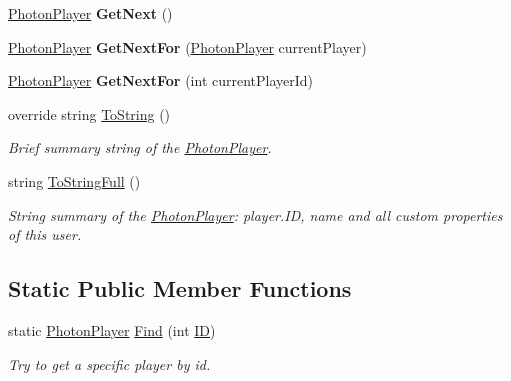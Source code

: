 \begin{DoxyCompactItemize}
\item 
\hyperlink{class_photon_player}{Photon\+Player} {\bfseries Get\+Next} ()\hypertarget{class_photon_player_a4c7bf5d0bf28c15b67929a8a5297b96e}{}\label{class_photon_player_a4c7bf5d0bf28c15b67929a8a5297b96e}

\item 
\hyperlink{class_photon_player}{Photon\+Player} {\bfseries Get\+Next\+For} (\hyperlink{class_photon_player}{Photon\+Player} current\+Player)\hypertarget{class_photon_player_a2cc6f30dc2691bc700b0a11bdaffcffd}{}\label{class_photon_player_a2cc6f30dc2691bc700b0a11bdaffcffd}

\item 
\hyperlink{class_photon_player}{Photon\+Player} {\bfseries Get\+Next\+For} (int current\+Player\+Id)\hypertarget{class_photon_player_adb4677870c9c5903527ce75dc0edba2b}{}\label{class_photon_player_adb4677870c9c5903527ce75dc0edba2b}

\item 
override string \hyperlink{class_photon_player_a0f41b47ae95448d2e6f7a4394c54f359}{To\+String} ()
\begin{DoxyCompactList}\small\item\em Brief summary string of the \hyperlink{class_photon_player}{Photon\+Player}. \end{DoxyCompactList}\item 
string \hyperlink{class_photon_player_af03034498d0b8bedf022decd6a570d70}{To\+String\+Full} ()
\begin{DoxyCompactList}\small\item\em String summary of the \hyperlink{class_photon_player}{Photon\+Player}\+: player.\+ID, name and all custom properties of this user. \end{DoxyCompactList}\end{DoxyCompactItemize}
\subsection*{Static Public Member Functions}
\begin{DoxyCompactItemize}
\item 
static \hyperlink{class_photon_player}{Photon\+Player} \hyperlink{class_photon_player_a32462ded2866ee76839b59bd2cb3cd8c}{Find} (int \hyperlink{class_photon_player_ac363d86e7c6ea63573e0ecfda7f7eaa7}{ID})
\begin{DoxyCompactList}\small\item\em Try to get a specific player by id. \end{DoxyCompactList}\end{DoxyCompactItemize}
